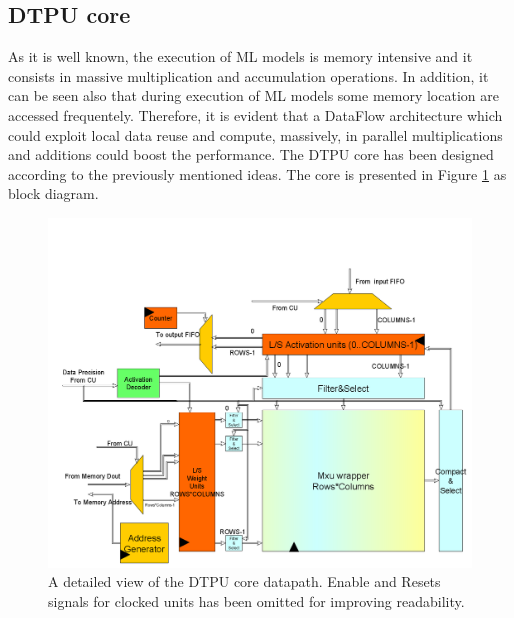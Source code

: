 \subsection{DTPU core}
As it is well known, the execution of ML models is memory intensive and it consists in massive multiplication and accumulation operations. In addition, it can be seen also that during execution of ML models some memory location are accessed frequentely. Therefore, it is evident that a DataFlow architecture which could exploit local data reuse and compute, massively, in parallel multiplications and additions  could boost the performance.
The DTPU core has been designed according to the previously mentioned ideas.
The core is presented in Figure \ref{fig:datapath} as block diagram.
\begin{figure}[H]
\centering
\captionsetup{justification=centering}
\includegraphics[scale=0.3,angle=0]{./figure/datapath_dtpu_core.png}
\caption{A detailed view of the DTPU core datapath. Enable and Resets signals for clocked units has been omitted for improving readability. }
\label{fig:datapath}
\end{figure} 

